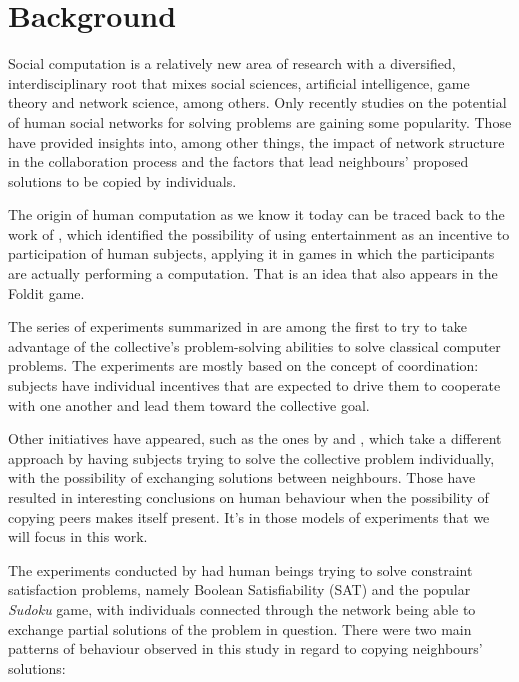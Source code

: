 \documentclass[letterpaper]{article}
\begin{document}
\section{Background}

Social computation is a relatively new area of research with a diversified, interdisciplinary root that mixes social sciences, artificial intelligence, game theory and network science, among others. Only recently studies on the potential of human social networks for solving problems are gaining some popularity. Those have provided insights into, among other things, the impact of network structure in the collaboration process and the factors that lead neighbours' proposed solutions to be copied by individuals.

The origin of human computation as we know it today can be traced back to the work of \cite{vonahm:gwap}, which identified the possibility of using entertainment as an incentive to participation of human subjects, applying it in games in which the participants are actually performing a computation. That is an idea that also appears in the Foldit game.

The series of experiments summarized in \cite{kearns:experim} are among the first to try to take advantage of the collective's problem-solving abilities to solve classical computer problems. The experiments are mostly based on the concept of coordination: subjects have individual incentives that are expected to drive them to cooperate with one another and lead them toward the collective goal.

Other initiatives have appeared, such as the ones by \cite{farenzena:collabem} and \cite{mason:collablearnet}, which take a different approach by having subjects trying to solve the collective problem individually, with the possibility of exchanging solutions between neighbours. Those have resulted in interesting conclusions on human behaviour when the possibility of copying peers makes itself present. It's in those models of experiments that we will focus in this work.

The experiments conducted by \cite{farenzena:collabem} had human beings trying to solve constraint satisfaction problems, namely Boolean Satisfiability (SAT) and the popular \emph{Sudoku} game, with individuals connected through the network being able to exchange partial solutions of the problem in question. There were two main patterns of behaviour observed in this study in regard to copying neighbours' solutions:
\end{document}
